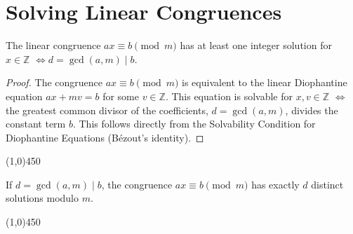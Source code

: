 \section{Solving Linear Congruences}

\begin{proposition}
The linear congruence $a x \equiv b \pmod{m}$ has at least one integer solution for $x \in \mathbb{Z}$ $\iff d = \gcd(a, m) \mid b$.
\end{proposition}
\begin{proof}
The congruence $a x \equiv b \pmod{m}$ is equivalent to the linear Diophantine equation $a x + m v = b$ for some $v \in \mathbb{Z}$.
This equation is solvable for $x, v \in \mathbb{Z}$ $\iff$ the greatest common divisor of the coefficients, $d = \gcd(a, m)$, divides the constant term $b$. This follows directly from the Solvability Condition for Diophantine Equations (Bézout's identity). \qedhere
\end{proof}

\begin{center}
    \vspace{10pt}
    \line(1,0){450}
    \vspace{25pt}
\end{center}

\begin{proposition}
If $d = \gcd(a, m) \mid b$, the congruence $a x \equiv b \pmod{m}$ has exactly $d$ distinct solutions modulo $m$.
\end{proposition}

\begin{center}
    \vspace{10pt}
    \line(1,0){450}
    \vspace{25pt}
\end{center}